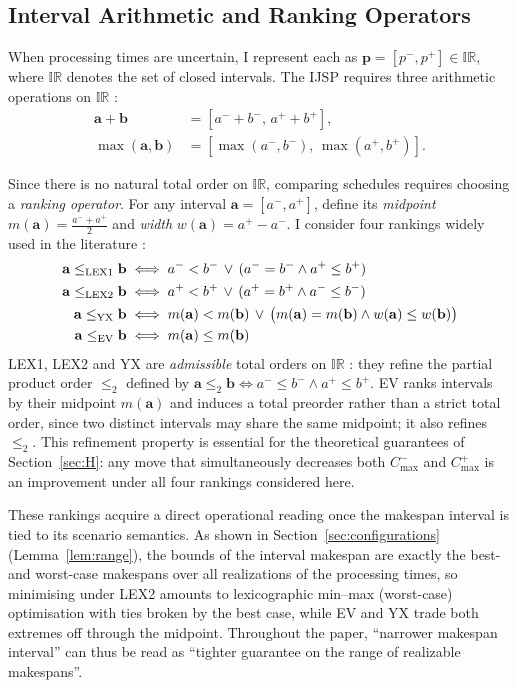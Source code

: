\documentclass[preprint,12pt]{elsarticle}
\begin{document}
\subsection{Interval Arithmetic and Ranking Operators}
\label{sec:rankings}

When processing times are uncertain, I represent each as $\mathbf{p}=[p^-, p^+] \in \mathbb{IR}$, where $\mathbb{IR}$ denotes the set of closed intervals. The IJSP requires three arithmetic operations on $\mathbb{IR}$ \cite{Moore2009}:
\begin{align}
\mathbf{a} + \mathbf{b}        &= [a^- + b^-,\, a^+ + b^+], \\
\max(\mathbf{a},\mathbf{b})    &= [\max(a^-,b^-),\, \max(a^+,b^+)].
\end{align}

Since there is no natural total order on $\mathbb{IR}$, comparing schedules requires choosing a \emph{ranking operator}. For any interval $\mathbf{a}=[a^-,a^+]$, define its \emph{midpoint} $m(\mathbf{a})=\tfrac{a^-+a^+}{2}$ and \emph{width} $w(\mathbf{a})=a^+-a^-$. I consider four rankings widely used in the literature \cite{Bustince2013,Xu2006,Lei2012c}:
\begin{align}
\mathbf{a} \leq_{\rm LEX1} \mathbf{b} &\iff a^- < b^- \,\vee\, (a^- = b^- \wedge a^+ \leq b^+) \\
\mathbf{a} \leq_{\rm LEX2} \mathbf{b} &\iff a^+ < b^+ \,\vee\, (a^+ = b^+ \wedge a^- \leq b^-) \\
\mathbf{a} \leq_{\rm YX}   \mathbf{b} &\iff m(\mathbf{a}) < m(\mathbf{b}) \,\vee\, \bigl(m(\mathbf{a}) = m(\mathbf{b}) \wedge w(\mathbf{a}) \leq w(\mathbf{b})\bigr) \\
\mathbf{a} \leq_{\rm EV}   \mathbf{b} &\iff m(\mathbf{a}) \leq m(\mathbf{b})
\end{align}
LEX1, LEX2 and YX are \emph{admissible} total orders on $\mathbb{IR}$ \cite{Bustince2013}: they refine the partial product order $\leq_{2}$ defined by $\mathbf{a} \leq_{2} \mathbf{b} \iff a^- \leq b^- \wedge a^+ \leq b^+$. EV ranks intervals by their midpoint $m(\mathbf{a})$ and induces a total preorder rather than a strict total order, since two distinct intervals may share the same midpoint; it also refines $\leq_{2}$. This refinement property is essential for the theoretical guarantees of Section~\ref{sec:H}: any move that simultaneously decreases both $C^-_{\max}$ and $C^+_{\max}$ is an improvement under all four rankings considered here.

These rankings acquire a direct operational reading once the makespan interval is tied to its scenario semantics. As shown in Section~\ref{sec:configurations} (Lemma~\ref{lem:range}), the bounds of the interval makespan are exactly the best- and worst-case makespans over all realizations of the processing times, so minimising under LEX2 amounts to lexicographic min--max (worst-case) optimisation with ties broken by the best case, while EV and YX trade both extremes off through the midpoint. Throughout the paper, ``narrower makespan interval'' can thus be read as ``tighter guarantee on the range of realizable makespans''.
\end{document}
